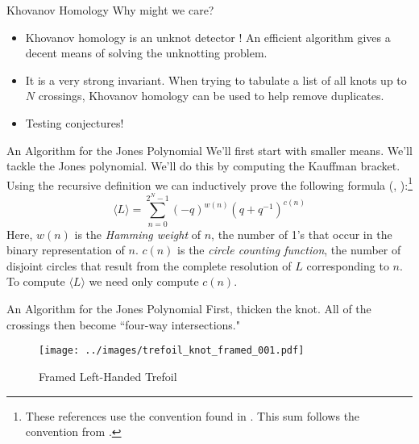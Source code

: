 \documentclass{beamer}
\begin{document}
    \begin{frame}{Khovanov Homology}
        Why might we care?
        \begin{itemize}
            \item
                Khovanov homology is an unknot detector
                \cite{KronheimerMrowka2011KhovanovUnknot}!
                An efficient algorithm gives a decent means of solving
                the unknotting problem.
            \item It is a very strong invariant. When trying to tabulate a list
                  of all knots up to $N$ crossings, Khovanov homology can be
                  used to help remove duplicates.
            \item Testing conjectures!
        \end{itemize}
    \end{frame}
    \begin{frame}{An Algorithm for the Jones Polynomial}
        We'll first start with smaller means. We'll tackle the Jones
        polynomial. We'll do this by computing the Kauffman bracket. Using the
        recursive definition we can inductively prove the following formula
        (\cite[p.~158]{AdamsTheKnotBook}, \cite[p.~10]{Liu2022ABI}):\footnote{%
            These references use the convention found in
            \cite{KauffmanStateModels}. This sum follows the convention
            from \cite{BarNatanKhovanovJones}.
        }
        \begin{equation}
            \label{eqn:kauffman_bracket}%
            \langle{L}\rangle=\sum_{n=0}^{2^{N}-1}
                (-q)^{w(n)}(q+q^{-1})^{c(n)}
        \end{equation}
        Here, $w(n)$ is the \textit{Hamming weight} of $n$, the number of 1's
        that occur in the binary representation of $n$. $c(n)$ is the
        \textit{circle counting function}, the number of disjoint circles that
        result from the complete resolution of $L$ corresponding to $n$.
        To compute $\langle{L}\rangle$ we need only compute $c(n)$.
    \end{frame}
    \begin{frame}{An Algorithm for the Jones Polynomial}
        First, thicken the knot. All of the crossings then become
        ``four-way intersections."
        \begin{figure}
            \centering
            \texttt{[image: ../images/trefoil\_knot\_framed\_001.pdf]}
            \caption{Framed Left-Handed Trefoil}
            \label{fig:trefoil_knot_framed_001}
        \end{figure}
    \end{frame}
\end{document}

